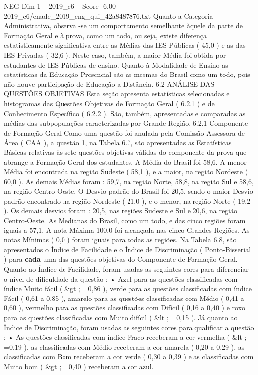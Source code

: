 \begin{textsample}{NEG Dim 1 – 2019\_c6 – Score -6.00 – 2019\_c6/enade\_2019\_eng\_qui\_42a8487876.txt}
Quanto a Categoria Administrativa, observa -se um comportamento semelhante àquele da parte de Formação Geral e à prova, como um todo, ou seja, existe diferença estatisticamente significativa entre as Médias das IES Públicas ( 45,0 ) e as das IES Privadas ( 32,6 ).
Neste caso, também, a maior Média foi obtida por estudantes de IES Públicas de ensino.
Quanto à Modalidade de Ensino as estatísticas da Educação Presencial são as mesmas do Brasil como um todo, pois não houve participação de Educação a Distância. 6.2 ANÁLISE DAS QUESTÕES OBJETIVAS Esta seção apresenta estatísticas selecionadas e histogramas das Questões Objetivas de Formação Geral ( 6.2.1 ) e de Conhecimento Específico ( 6.2.2 ).
São, também, apresentadas e comparadas as médias das subpopulações caracterizadas por Grande Região. 6.2.1 Componente de Formação Geral Como uma questão foi anulada pela Comissão Assessora de Área ( CAA ), a questão 1, na Tabela 6.7, são apresentadas as Estatísticas Básicas relativas às sete questões objetivas válidas do componente da prova que abrange a Formação Geral dos estudantes.
A Média do Brasil foi 58,6.
A menor Média foi encontrada na região Sudeste ( 58,1 ), e a maior, na região Nordeste ( 60,0 ).
As demais Médias foram : 59,7, na região Norte, 58,8, na região Sul e 58,6, na região Centro-Oeste.
O Desvio padrão do Brasil foi 20,5, sendo o maior Desvio padrão encontrado na região Nordeste ( 21,0 ), e o menor, na região Norte ( 19,2 ).
Os demais desvios foram : 20,5, nas regiões Sudeste e Sul e 20,6, na região Centro-Oeste.
As Medianas do Brasil, como um todo, e das cinco regiões foram iguais a 57,1.
A nota Máxima 100,0 foi alcançada nas cinco Grandes Regiões.
As notas Mínimas ( 0,0 ) foram iguais para todas as regiões.
Na Tabela 6.8, são apresentados o Índice de Facilidade e o Índice de Discriminação ( Ponto-Bisserial ) para \textbf{cada} uma das questões objetivas do Componente de Formação Geral.
Quanto ao Índice de Facilidade, foram usadas as seguintes cores para diferenciar o nível de dificuldade da questão : • Azul para as questões classificadas com índice Muito fácil ( \&gt ; =0,86 ), verde para as questões classificadas com índice Fácil ( 0,61 a 0,85 ), amarelo para as questões classificadas com Médio ( 0,41 a 0,60 ), vermelho para as questões classificadas com Difícil ( 0,16 a 0,40 ) e roxo para as questões classificadas com Muito difícil ( \&lt ; =0,15 ).
Já quanto ao Índice de Discriminação, foram usadas as seguintes cores para qualificar a questão : • As questões classificadas com índice Fraco receberam a cor vermelha ( \&lt ; =0,19 ), as classificadas com Médio receberam a cor amarela ( 0,20 a 0,29 ), as classificadas com Bom receberam a cor verde ( 0,30 a 0,39 ) e as classificadas com Muito bom ( \&gt ; =0,40 ) receberam a cor azul.

\end{textsample}
